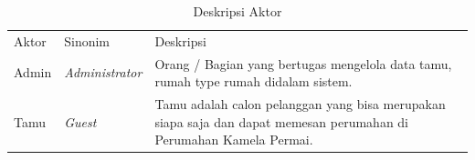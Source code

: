 \begin{longtable}[c]{|l|l|p{9cm}|} %
\captionsetup{position=above} %
\caption{Deskripsi Aktor}
\label{tab:my-table}\\
\hline
Aktor & Sinonim          & Deskripsi                                                                                                                                                                                      \\ \hline
\endfirsthead
\endhead
%
Admin  & \textit{Administrator}             & Orang / Bagian yang bertugas mengelola data tamu, rumah type rumah didalam sistem.                                      \\ \hline
Tamu  & \textit{Guest}     & Tamu adalah calon pelanggan yang bisa merupakan siapa saja dan dapat memesan perumahan di Perumahan Kamela Permai.                                                                                                                   \\ \hline
\end{longtable}

